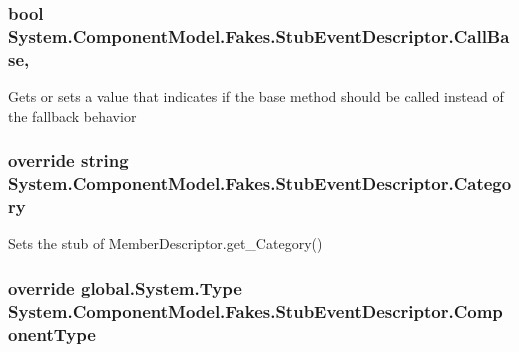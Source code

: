 \hypertarget{class_system_1_1_component_model_1_1_fakes_1_1_stub_event_descriptor_ab695d317fb24cb7ade781b5d9c810675}{
\subsubsection[{Call\-Base}]{\setlength{\rightskip}{0pt plus 5cm}bool System.\-Component\-Model.\-Fakes.\-Stub\-Event\-Descriptor.\-Call\-Base\hspace{0.3cm}{\ttfamily [get]}, {\ttfamily [set]}}}\label{class_system_1_1_component_model_1_1_fakes_1_1_stub_event_descriptor_ab695d317fb24cb7ade781b5d9c810675}


Gets or sets a value that indicates if the base method should be called instead of the fallback behavior

\hypertarget{class_system_1_1_component_model_1_1_fakes_1_1_stub_event_descriptor_a9cab122d7e29d38e41bff23f208f6c8e}{
\subsubsection[{Category}]{\setlength{\rightskip}{0pt plus 5cm}override string System.\-Component\-Model.\-Fakes.\-Stub\-Event\-Descriptor.\-Category\hspace{0.3cm}{\ttfamily [get]}}}\label{class_system_1_1_component_model_1_1_fakes_1_1_stub_event_descriptor_a9cab122d7e29d38e41bff23f208f6c8e}


Sets the stub of Member\-Descriptor.\-get\-\_\-\-Category()

\hypertarget{class_system_1_1_component_model_1_1_fakes_1_1_stub_event_descriptor_a9755cd01ee3cf2b7880e262fc40cfe19}{
\subsubsection[{Component\-Type}]{\setlength{\rightskip}{0pt plus 5cm}override global.\-System.\-Type System.\-Component\-Model.\-Fakes.\-Stub\-Event\-Descriptor.\-Component\-Type\hspace{0.3cm}{\ttfamily [get]}}}\label{class_system_1_1_component_model_1_1_fakes_1_1_stub_event_descriptor_a9755cd01ee3cf2b7880e262fc40cfe19}


